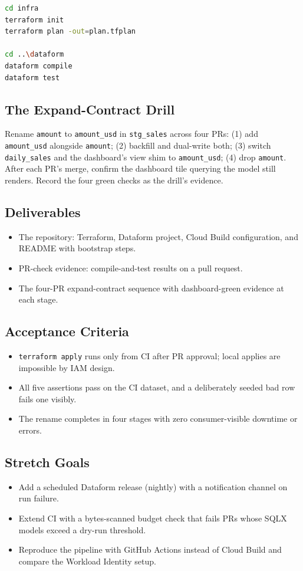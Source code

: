 \begin{lstlisting}[language=bash,caption={Local verification before pushing the first PR.}]
cd infra
terraform init
terraform plan -out=plan.tfplan

cd ..\dataform
dataform compile
dataform test
\end{lstlisting}

\subsection{The Expand-Contract Drill}
Rename \texttt{amount} to \texttt{amount\_usd} in \texttt{stg\_sales} across four PRs: (1) add \texttt{amount\_usd} alongside \texttt{amount}; (2) backfill and dual-write both; (3) switch \texttt{daily\_sales} and the dashboard's view shim to \texttt{amount\_usd}; (4) drop \texttt{amount}. After each PR's merge, confirm the dashboard tile querying the model still renders. Record the four green checks as the drill's evidence.

\subsection*{Deliverables}
\begin{itemize}
    \item The repository: Terraform, Dataform project, Cloud Build configuration, and README with bootstrap steps.
    \item PR-check evidence: compile-and-test results on a pull request.
    \item The four-PR expand-contract sequence with dashboard-green evidence at each stage.
\end{itemize}

\subsection*{Acceptance Criteria}
\begin{itemize}
    \item \texttt{terraform apply} runs only from CI after PR approval; local applies are impossible by IAM design.
    \item All five assertions pass on the CI dataset, and a deliberately seeded bad row fails one visibly.
    \item The rename completes in four stages with zero consumer-visible downtime or errors.
\end{itemize}

\subsection*{Stretch Goals}
\begin{itemize}
    \item Add a scheduled Dataform release (nightly) with a notification channel on run failure.
    \item Extend CI with a bytes-scanned budget check that fails PRs whose SQLX models exceed a dry-run threshold.
    \item Reproduce the pipeline with GitHub Actions instead of Cloud Build and compare the Workload Identity setup.
\end{itemize}

